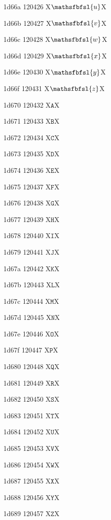 \documentclass[11pt]{article}
\begin{document}
1d66a 120426 X{\ensuremath{\mathsfbfsl{u}}}X

1d66b 120427 X{\ensuremath{\mathsfbfsl{v}}}X

1d66c 120428 X{\ensuremath{\mathsfbfsl{w}}}X

1d66d 120429 X{\ensuremath{\mathsfbfsl{x}}}X

1d66e 120430 X{\ensuremath{\mathsfbfsl{y}}}X

1d66f 120431 X{\ensuremath{\mathsfbfsl{z}}}X

1d670 120432 X{\ensuremath{\mathtt{A}}}X

1d671 120433 X{\ensuremath{\mathtt{B}}}X

1d672 120434 X{\ensuremath{\mathtt{C}}}X

1d673 120435 X{\ensuremath{\mathtt{D}}}X

1d674 120436 X{\ensuremath{\mathtt{E}}}X

1d675 120437 X{\ensuremath{\mathtt{F}}}X

1d676 120438 X{\ensuremath{\mathtt{G}}}X

1d677 120439 X{\ensuremath{\mathtt{H}}}X

1d678 120440 X{\ensuremath{\mathtt{I}}}X

1d679 120441 X{\ensuremath{\mathtt{J}}}X

1d67a 120442 X{\ensuremath{\mathtt{K}}}X

1d67b 120443 X{\ensuremath{\mathtt{L}}}X

1d67c 120444 X{\ensuremath{\mathtt{M}}}X

1d67d 120445 X{\ensuremath{\mathtt{N}}}X

1d67e 120446 X{\ensuremath{\mathtt{O}}}X

1d67f 120447 X{\ensuremath{\mathtt{P}}}X

1d680 120448 X{\ensuremath{\mathtt{Q}}}X

1d681 120449 X{\ensuremath{\mathtt{R}}}X

1d682 120450 X{\ensuremath{\mathtt{S}}}X

1d683 120451 X{\ensuremath{\mathtt{T}}}X

1d684 120452 X{\ensuremath{\mathtt{U}}}X

1d685 120453 X{\ensuremath{\mathtt{V}}}X

1d686 120454 X{\ensuremath{\mathtt{W}}}X

1d687 120455 X{\ensuremath{\mathtt{X}}}X

1d688 120456 X{\ensuremath{\mathtt{Y}}}X

1d689 120457 X{\ensuremath{\mathtt{Z}}}X
\end{document}
